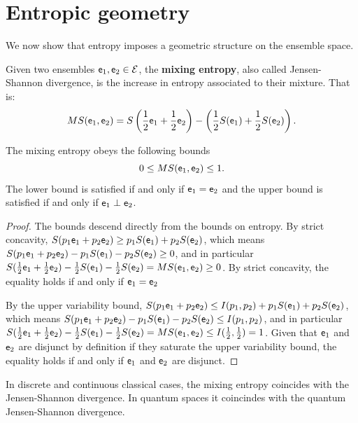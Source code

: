 \section{Entropic geometry}

We now show that entropy imposes a geometric structure on the ensemble space.

\begin{defn}
	Given two ensembles $\mathsf{e}_1, \mathsf{e}_2 \in \mathcal{E}$, the \textbf{mixing entropy}, also called Jensen-Shannon divergence, is the increase in entropy associated to their mixture. That is:
	$$MS(\mathsf{e}_1, \mathsf{e}_2) = S\left(\frac{1}{2}\mathsf{e}_1 + \frac{1}{2} \mathsf{e}_2\right) - \left(\frac{1}{2} S(\mathsf{e}_1) + \frac{1}{2} S(\mathsf{e}_2)\right).$$
\end{defn}

\begin{coro}
	The mixing entropy obeys the following bounds
	$$ 0 \leq MS(\mathsf{e}_1, \mathsf{e}_2) \leq 1.$$
	The lower bound is satisfied if and only if $\mathsf{e}_1 = \mathsf{e}_2$ and the upper bound is satisfied if and only if $\mathsf{e}_1 \perp \mathsf{e}_2$.
\end{coro}

\begin{proof}
	The bounds descend directly from the bounds on entropy. By strict concavity, $S(p_1\mathsf{e}_1 + p_2 \mathsf{e}_2) \geq p_1 S(\mathsf{e}_1) + p_2 S(\mathsf{e}_2)$, which means $S(p_1\mathsf{e}_1 + p_2 \mathsf{e}_2) - p_1 S(\mathsf{e}_1) - p_2 S(\mathsf{e}_2) \geq 0$, and in particular $S(\frac{1}{2} \mathsf{e}_1 + \frac{1}{2} \mathsf{e}_2) - \frac{1}{2} S(\mathsf{e}_1) - \frac{1}{2} S(\mathsf{e}_2) = MS(\mathsf{e}_1, \mathsf{e}_2) \geq 0$. By strict concavity, the equality holds if and only if $\mathsf{e}_1 = \mathsf{e}_2$
	
	By the upper variability bound, $S(p_1\mathsf{e}_1 + p_2 \mathsf{e}_2) \leq I(p_1, p_2) + p_1 S(\mathsf{e}_1) + p_2 S(\mathsf{e}_2)$, which means $S(p_1\mathsf{e}_1 + p_2 \mathsf{e}_2) - p_1 S(\mathsf{e}_1) - p_2 S(\mathsf{e}_2) \leq I(p_1, p_2)$, and in particular $S(\frac{1}{2} \mathsf{e}_1 + \frac{1}{2} \mathsf{e}_2) - \frac{1}{2} S(\mathsf{e}_1) - \frac{1}{2} S(\mathsf{e}_2) = MS(\mathsf{e}_1, \mathsf{e}_2) \leq I(\frac{1}{2}, \frac{1}{2}) = 1$. Given that $\mathsf{e}_1$ and $\mathsf{e}_2$ are disjunct by definition if they saturate the upper variability bound, the equality holds if and only if $\mathsf{e}_1$ and $\mathsf{e}_2$ are disjunct.
\end{proof}

\begin{prop}
	In discrete and continuous classical cases, the mixing entropy coincides with the Jensen-Shannon divergence. In quantum spaces it coincindes with the quantum Jensen-Shannon divergence.
\end{prop}

